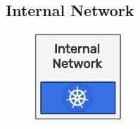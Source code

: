 \subsection{Internal Network}
\label{subsec:architecture_network_internal_network}

\begin{figure}
  \centering
  \includegraphics[width=\linewidth]{images/architecture/internal_network.pdf}
\end{figure}


